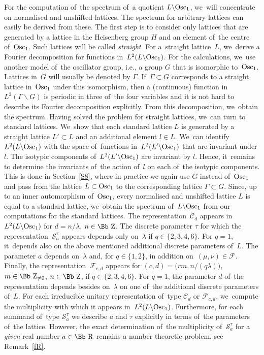 \documentclass[10pt,a4paper]{amsart}
\newcommand\RR{{\mbox{\Bb R}}}
\newcommand\ZZ{{\mbox{\Bb Z}}}
\newcommand\cC{{\mathcal C}}
\newcommand\cF{{\mathcal F}}
\newcommand{\Osc}{{\rm Osc}}
\numberwithin{equation}{section}
\begin{document}
 For the computation of~the spectrum of~a quotient $L\backslash \Osc_1$, we~will concentrate on normalised and unshifted lattices. The spectrum for arbitrary lattices can easily be derived from these. The first step is to consider only lattices that are generated by a lattice in the Heisenberg group $H$ and an element of~the centre of~$\Osc_1$. Such lattices will be called {\it straight}. For a~straight lattice~$L$, we~derive a Fourier decomposition for functions in~$L^2(L\backslash \Osc_1)$. For the calculations, we~use another model of~the oscillator group, i.e., a group $G$ that is isomorphic to~$\Osc_1$. Lattices in~$G$ will usually be denoted by $\Gamma$. If~$\Gamma\subset G$ corresponds to a straight lattice in~$\Osc_1$ under this isomorphism, then a (continuous) function in~$L^2(\Gamma\backslash G)$ is periodic in three of~the four variables and it is not hard to describe its Fourier decomposition explicitly. From this decomposition, we~obtain the spectrum. Having solved the problem for straight lattices, we~can turn to standard lattices. We~show that each standard lattice $L$ is generated by a straight lattice $L'\subset L$ and an additional element $l\in L$. We~can identify $L^2(L\backslash \Osc_1)$ with the space of~functions in~$L^2(L'\backslash \Osc_1)$ that are invariant under $l$. The isotypic components of~$L^2(L'\backslash \Osc_1)$ are invariant by $l$. Hence, it~remains to determine the invariants of~the action of~$l$ on each of~the isotypic components. This is done in Section~\ref{S8}, where in practice we again use $G$ instead of~$\Osc_1$ and pass from the lattice $L\subset \Osc_1$ to the corresponding lattice $\Gamma\subset G$.
Since, up to an inner automorphism of~$\Osc_1$, every normalised and unshifted lattice $L$ is equal to a standard lattice, we~obtain the spectrum of~$L\backslash \Osc_1$ from our computations for the standard lattices. The representation~$\cC_d$ appears in~$L^2(L\backslash \Osc_1)$ for $d=n/\lambda$, $n\in\ZZ$. The discrete parameter $\tau$ for which the representation~${\mathcal S}_a^\tau$ appears depends only on~$\lambda$ if $q\in\{2,3,4,6\}$. For $q=1$, it~depends also on the above mentioned additional discrete parameters of~$L$. The parameter $a$ depends on~$\lambda$ and, for $q\in\{1,2\}$, in addition on~$(\mu,\nu)\in\cF$. Finally, the representation~$\cF_{c,d}$ appears for $(c,d)=\big(rm,n/(q\lambda)\big)$, $m\in\ZZ_{\not=0}$, $n\in\ZZ$, if $q\in\{2,3,4,6\}$. For $q=1$, the parameter $d$ of~the representation depends besides on~$\lambda$ on one of~the additional discrete parameters of~$L$. For each irreducible unitary representation of~type $\cC_d$ or $\cF_{c,d}$, we~compute the multiplicity with which it appears in~$L^2(L\backslash \Osc_1)$. Furthermore, for each summand of~type ${\mathcal S}_a^\tau$ we describe $a$ and $\tau$ explicitly in terms of~the parameters of~the lattice. However, the exact determination of~the multiplicity of~${\mathcal S}_a^\tau$ for a \emph{given} real number $a\in\RR$ remains a number theoretic problem, see Remark~\ref{fR}.
\end{document}

